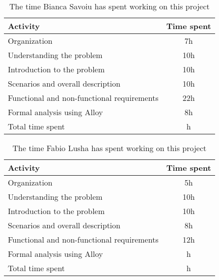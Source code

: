 \label{sec:Effort spent}%
\begin{table}[h!]
    \centering
    \begin{tabular}{|l|c|}
     \hline
     \textbf{Activity} & \textbf{Time spent} \\
    \hline
    Organization & 7h \\
    \hline
    Understanding the problem & 10h \\
    \hline
    Introduction to the problem & 10h \\
    \hline
    Scenarios and overall description & 10h \\
    \hline
    Functional and non-functional requirements & 22h \\
    \hline
    Formal analysis using Alloy & 8h \\
    \hline
    Total time spent & h \\
    \hline
\end{tabular}
    \caption{The time Bianca Savoiu has spent working on this project}
    \label{tab:Assumptions}
\end{table}


\begin{table}[h!]
    \centering
    \begin{tabular}{|l|c|}
    \hline
     \textbf{Activity} & \textbf{Time spent} \\
    \hline
    Organization & 5h \\
    \hline
    Understanding the problem & 10h \\
    \hline
    Introduction to the problem & 10h \\
    \hline
    Scenarios and overall description & 8h \\
    \hline
    Functional and non-functional requirements & 12h \\
    \hline
    Formal analysis using Alloy & h \\
    \hline
    Total time spent & h \\
    \hline
\end{tabular}
    \caption{The time Fabio Lusha has spent working on this project}
    \label{tab:Assumptions}
\end{table}